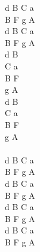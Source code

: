 \documentclass[a5paper, 10pt]{book}
\begin{document}
\begin{minipage}[t]{0.3\textwidth}
d B C a\\
B F g A\\
d B C a\\
B F g A\\

d B\\
C a\\
B F\\
g A\\
d B\\
C a\\
B F\\
g A\\
\\
d B C a\\
B F g A\\
d B C a\\
B F g A\\

d B C a\\
B F g A\\
d B C a\\
B F g A\\
\end{minipage}  

\newpage
\end{document}
